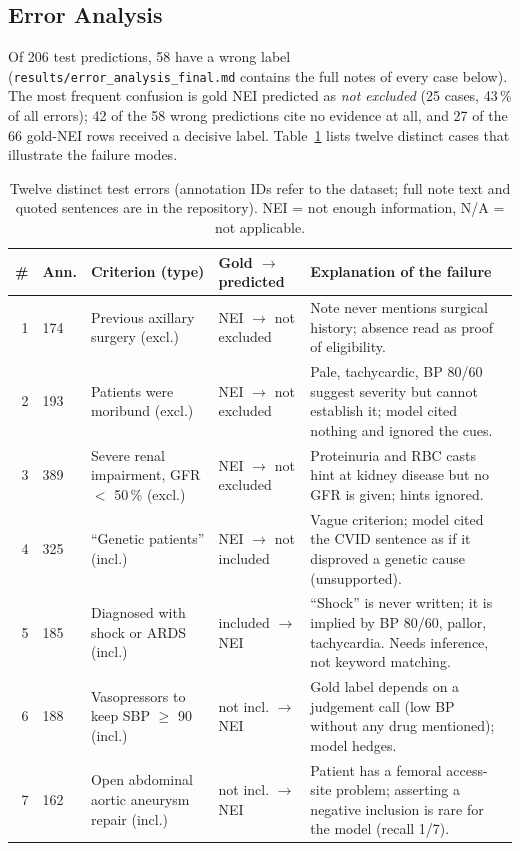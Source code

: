 \subsection{Error Analysis}
Of 206 test predictions, 58 have a wrong label (\texttt{results/error\_analysis\_final.md} contains the full notes of every case below). The most frequent confusion is gold NEI predicted as \emph{not excluded} (25 cases, 43\,\% of all errors); 42 of the 58 wrong predictions cite no evidence at all, and 27 of the 66 gold-NEI rows received a decisive label. Table~\ref{tab:errors} lists twelve distinct cases that illustrate the failure modes.

\begin{table}[t]
\caption{Twelve distinct test errors (annotation IDs refer to the dataset; full note text and quoted sentences are in the repository). NEI = not enough information, N/A = not applicable.}
\label{tab:errors}
\centering\footnotesize
\begin{tabular}{rlp{4.1cm}lp{6.8cm}}
\hline
\# & Ann. & Criterion (type) & Gold $\rightarrow$ predicted & Explanation of the failure \\
\hline
1 & 174 & Previous axillary surgery (excl.) & NEI $\rightarrow$ not excluded & Note never mentions surgical history; absence read as proof of eligibility. \\
2 & 193 & Patients were moribund (excl.) & NEI $\rightarrow$ not excluded & Pale, tachycardic, BP 80/60 suggest severity but cannot establish it; model cited nothing and ignored the cues. \\
3 & 389 & Severe renal impairment, GFR $<$ 50\,\% (excl.) & NEI $\rightarrow$ not excluded & Proteinuria and RBC casts hint at kidney disease but no GFR is given; hints ignored. \\
4 & 325 & ``Genetic patients'' (incl.) & NEI $\rightarrow$ not included & Vague criterion; model cited the CVID sentence as if it disproved a genetic cause (unsupported). \\
5 & 185 & Diagnosed with shock or ARDS (incl.) & included $\rightarrow$ NEI & ``Shock'' is never written; it is implied by BP 80/60, pallor, tachycardia. Needs inference, not keyword matching. \\
6 & 188 & Vasopressors to keep SBP $\ge$ 90 (incl.) & not incl. $\rightarrow$ NEI & Gold label depends on a judgement call (low BP without any drug mentioned); model hedges. \\
7 & 162 & Open abdominal aortic aneurysm repair (incl.) & not incl. $\rightarrow$ NEI & Patient has a femoral access-site problem; asserting a negative inclusion is rare for the model (recall 1/7). \\

\end{tabular}
\end{table}
